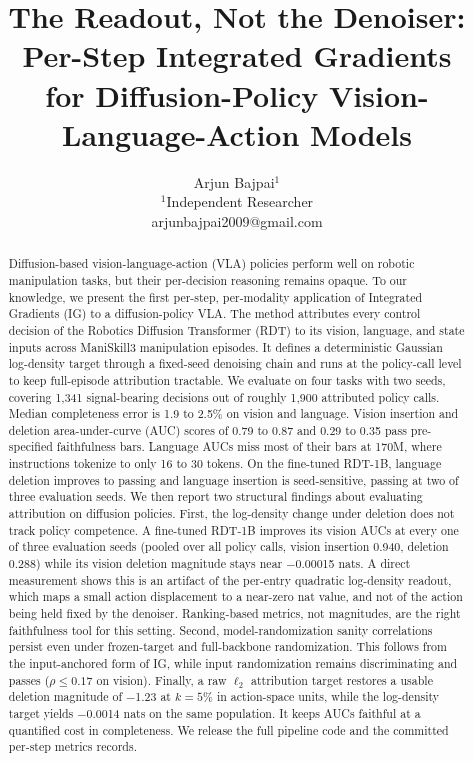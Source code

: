 \documentclass{article}
\title{The Readout, Not the Denoiser: Per-Step Integrated Gradients\\for Diffusion-Policy Vision-Language-Action Models}
\author{
Arjun Bajpai$^1$\\
\affiliations
$^1$Independent Researcher\\
\emails
arjunbajpai2009@gmail.com
}
\begin{document}
\maketitle

\begin{abstract}
Diffusion-based vision-language-action (VLA) policies perform well on robotic manipulation tasks, but their per-decision reasoning remains opaque.
To our knowledge, we present the first per-step, per-modality application of Integrated Gradients (IG) to a diffusion-policy VLA.
The method attributes every control decision of the Robotics Diffusion Transformer (RDT) to its vision, language, and state inputs across ManiSkill3 manipulation episodes.
It defines a deterministic Gaussian log-density target through a fixed-seed denoising chain and runs at the policy-call level to keep full-episode attribution tractable.
We evaluate on four tasks with two seeds, covering 1{,}341 signal-bearing decisions out of roughly 1{,}900 attributed policy calls.
Median completeness error is 1.9 to 2.5\% on vision and language.
Vision insertion and deletion area-under-curve (AUC) scores of 0.79 to 0.87 and 0.29 to 0.35 pass pre-specified faithfulness bars.
Language AUCs miss most of their bars at 170M, where instructions tokenize to only 16 to 30 tokens.
On the fine-tuned RDT-1B, language deletion improves to passing and language insertion is seed-sensitive, passing at two of three evaluation seeds.
We then report two structural findings about evaluating attribution on diffusion policies.
First, the log-density change under deletion does not track policy competence.
A fine-tuned RDT-1B improves its vision AUCs at every one of three evaluation seeds (pooled over all policy calls, vision insertion 0.940, deletion 0.288) while its vision deletion magnitude stays near $-$0.00015 nats.
A direct measurement shows this is an artifact of the per-entry quadratic log-density readout, which maps a small action displacement to a near-zero nat value, and not of the action being held fixed by the denoiser.
Ranking-based metrics, not magnitudes, are the right faithfulness tool for this setting.
Second, model-randomization sanity correlations persist even under frozen-target and full-backbone randomization.
This follows from the input-anchored form of IG, while input randomization remains discriminating and passes ($\rho \leq 0.17$ on vision).
Finally, a raw $\ell_2$ attribution target restores a usable deletion magnitude of $-$1.23 at $k{=}5\%$ in action-space units, while the log-density target yields $-$0.0014 nats on the same population.
It keeps AUCs faithful at a quantified cost in completeness.
We release the full pipeline code and the committed per-step metrics records.
\end{abstract}
\end{document}
